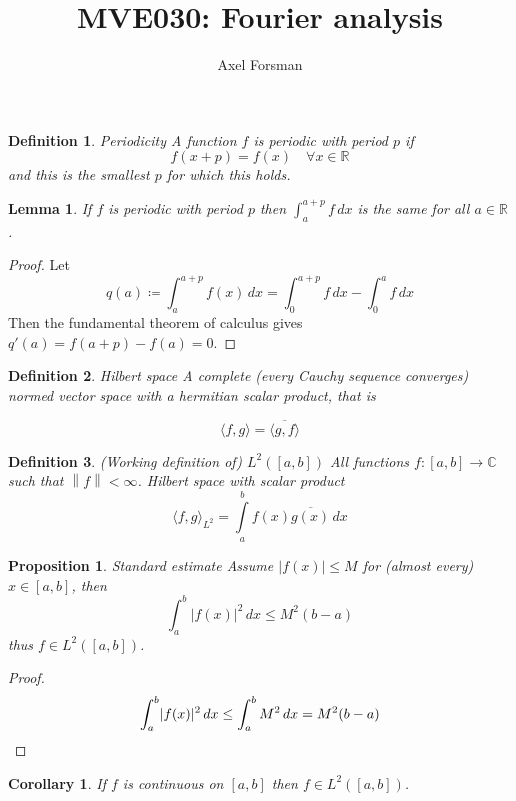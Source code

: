 \documentclass{article}
\title{MVE030: Fourier analysis}
\author{Axel Forsman}
\newtheorem{definition}{Definition}
\newtheorem{lemma}[theorem]{Lemma}
\newtheorem{proposition}{Proposition}
\newtheorem{corollary}{Corollary}[theorem]
\newcommand{\norm}[1]{\left\lVert#1\right\rVert}
\begin{document}
\maketitle

\begin{definition}{Periodicity}
	A function $f$ is \emph{periodic} with period $p$ if
	$$ f(x + p) = f(x) \quad \forall x \in \mathbb R $$
	and this is the smallest $p$ for which this holds.
\end{definition}

\begin{lemma}
	If $f$ is periodic with period $p$ then
	$\int_a^{a + p} f \, dx$
	is the same for all $a \in \mathbb R$.
\end{lemma}

\begin{proof}
	Let
	$$ q(a) \coloneqq \int_a^{a + p} f(x) \, dx = \int_0^{a + p} f \, dx - \int_0^a f \, dx $$
	Then the fundamental theorem of calculus gives $ q'(a) = f(a + p) - f(a) = 0 $.
\end{proof}

\begin{definition}{Hilbert space}
	A complete (every Cauchy sequence converges) normed vector space
	with a hermitian scalar product, that is

	$$ \langle f, g \rangle = \overline{\langle g, f \rangle} $$
\end{definition}

\begin{definition}{(Working definition of) $L^2([a, b])$}
	All functions $f : [a, b] \to \mathbb C$ such that $\norm f < \infty$.
	Hilbert space with scalar product
	$$ \langle f, g \rangle_{L^2} = \int\limits_a^b f(x) \overline{g(x)} \, dx $$
\end{definition}

\begin{proposition}{Standard estimate}
	Assume $\lvert f(x) \rvert \le M$ for (almost every) $x \in [a, b]$, then
	$$ \int_a^b \lvert f(x) \rvert^2 \, dx \le M^2 (b - a) $$
	thus $f \in L^2([a, b])$.
\end{proposition}
\begin{proof}
	$$ \int_a^b \lvert f(x) \rvert^2 \, dx \le \int_a^b M^2 \, dx = M^2 (b - a) \qedhere $$
\end{proof}

\begin{corollary}
	If $f$ is continuous on $[a, b]$ then $f \in L^2([a, b])$.
\end{corollary}
\end{document}
